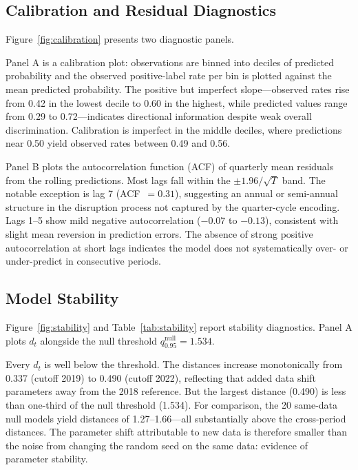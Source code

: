 \documentclass[12pt]{article}
\begin{document}
\subsection{Calibration and Residual Diagnostics}

Figure~\ref{fig:calibration} presents two diagnostic panels.

Panel A is a calibration plot: observations are binned into deciles of
predicted probability and the observed positive-label rate per bin is
plotted against the mean predicted probability.  The positive but imperfect
slope---observed rates rise from 0.42 in the lowest decile to 0.60 in the
highest, while predicted values range from 0.29 to 0.72---indicates
directional information despite weak overall discrimination.  Calibration
is imperfect in the middle deciles, where predictions near 0.50 yield
observed rates between 0.49 and 0.56.

Panel B plots the autocorrelation function (ACF) of quarterly mean
residuals from the rolling predictions.  Most lags fall within the
$\pm 1.96/\sqrt{T}$ band.  The notable exception is lag 7 (ACF~$= 0.31$),
suggesting an annual or semi-annual structure in the disruption process
not captured by the quarter-cycle encoding.  Lags 1--5 show mild negative
autocorrelation ($-0.07$ to $-0.13$), consistent with slight mean reversion
in prediction errors.  The absence of strong positive autocorrelation at
short lags indicates the model does not systematically over- or
under-predict in consecutive periods.

\subsection{Model Stability}

Figure~\ref{fig:stability} and Table~\ref{tab:stability} report stability
diagnostics.  Panel A plots $d_t$ alongside the null threshold
$q_{0.95}^{\text{null}} = 1.534$.

Every $d_t$ is well below the threshold.  The distances increase
monotonically from 0.337 (cutoff 2019) to 0.490 (cutoff 2022), reflecting
that added data shift parameters away from the 2018 reference.  But the
largest distance (0.490) is less than one-third of the null threshold
(1.534).  For comparison, the 20 same-data null models yield distances of
1.27--1.66---all substantially above the cross-period distances.  The
parameter shift attributable to new data is therefore smaller than the
noise from changing the random seed on the same data: evidence of parameter
stability.
\end{document}
